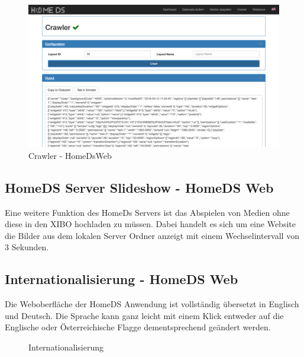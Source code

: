 \begin{figure}[H]
\centering
\includegraphics[width=1\textwidth]{images/08_HomeDsWeb/Crawler.png}
\caption{Crawler - HomeDsWeb}
\label{img:crawler}
\end{figure}

\subsection{HomeDS Server Slideshow - HomeDS Web}\label{sec:homedsslideshow}
Eine weitere Funktion des HomeDs Servers ist das Abspielen von Medien ohne diese in den XIBO hochladen zu müssen. Dabei handelt es sich um eine Website die Bilder aus dem lokalen Server Ordner anzeigt mit einem Wechselintervall von 3 Sekunden. 

\subsection{Internationalisierung - HomeDS Web}\label{sec:i18n}
Die Weboberfläche der HomeDS Anwendung ist vollständig übersetzt in Englisch und Deutsch. Die Sprache kann ganz leicht mit einem Klick entweder auf die Englische oder Österreichische Flagge dementsprechend geändert werden.

\begin{figure}[H]
    \centering
    \qquad
    \caption{Internationalisierung}
    \label{img:flags}
\end{figure}

